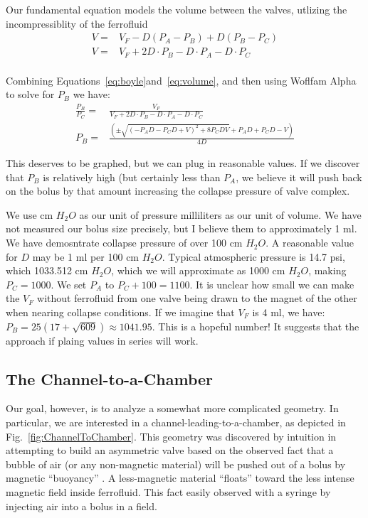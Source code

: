 \documentclass{asme2ej}
\begin{document}
Our fundamental equation models the volume between the
valves, utlizing the incompressiblity of the ferrofluid
\begin{align}
  V = & V_F - D(P_A - P_B) + D(P_B - P_C) \\
  V = & V_F + 2D\cdot P_B - D\cdot P_A - D\cdot P_C \\
    \label{eq:volume}
\end{align}

Combining Equations~\ref{eq:boyle}and~\ref{eq:volume}, and then
using Woflfam Alpha to solve for $P_B$ we have:
\begin{align}
  \frac{P_B}{P_C} = & \frac{V_F}{V_F + 2D\cdot P_B - D\cdot P_A - D\cdot P_C} \\
  P_B = & \frac{ (\pm \sqrt{(-P_A D - P_C D + V)^2 + 8 P_C D V} + P_A D + P_C D - V)}{4 D}
\end{align}

This deserves to be graphed, but we can plug in reasonable values.
If we discover that $P_B$ is relatively high (but certainly less than
$P_A$, we believe it will push back on the bolus by that amount increasing
the collapse pressure of valve complex.

We use cm $H_2O$ as our unit of pressure milliliters as our unit of volume.
We have not measured our bolus size precisely, but I believe them to approximately 1 ml. We have demosntrate collapse pressure of over 100 cm $H_2O$.
A reasonable value for $D$ may be 1 ml per 100 cm $H_2O$.
Typical atmospheric pressure is 14.7 psi, which 1033.512 cm $H_2O$, which
we will approximate as 1000 cm $H_2O$, making $P_C = 1000$.
We set $P_A$ to $P_C + 100 = 1100$.
It is unclear how small we can make the $V_F$ without ferrofluid
from one valve being drawn to the magnet of the other when nearing collapse
conditions. If we imagine that $V_F$ is 4 ml, we have:
$P_B  =  25 (17 + \sqrt{609})\approx 1041.95$. This is a hopeful number!
It suggests that the approach if plaing values in series will work.



\subsection{The Channel-to-a-Chamber}

Our goal, however, is to analyze a somewhat more complicated geometry.
In particular, we are interested in a channel-leading-to-a-chamber,
as depicted in Fig.~\ref{fig:ChannelToChamber}.
This geometry was discovered by intuition in attempting to build an asymmetric valve
based on the observed fact that a bubble of air (or any non-magnetic material) will
be pushed out of a bolus by magnetic ``buoyancy'' \cite{wakayama1997magnetic,cheng2014three}.
A less-magnetic material ``floats'' toward the less intense magnetic field inside
ferrofluid. This fact easily observed with a syringe by injecting air into a bolus
in a field.
\end{document}
